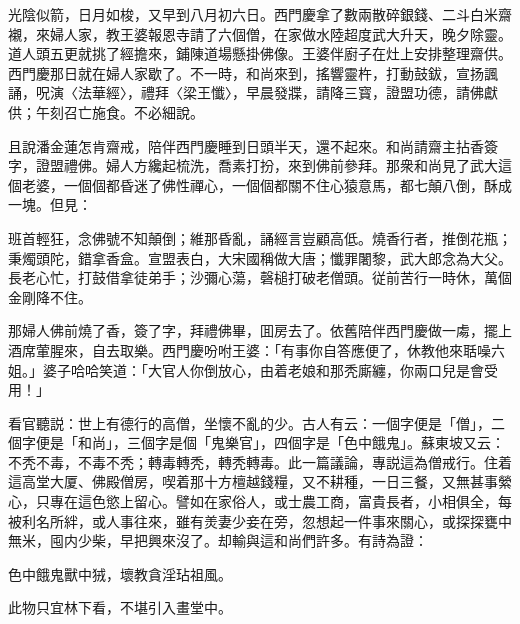 光陰似箭，日月如梭，又早到八月初六日。西門慶拿了數兩散碎銀錢、二斗白米齋襯，來婦人家，教王婆報恩寺請了六個僧，在家做水陸超度武大升天，晚夕除靈。道人頭五更就挑了經擔來，鋪陳道場懸掛佛像。王婆伴廚子在灶上安排整理齋供。西門慶那日就在婦人家歇了。不一時，和尚來到，搖響靈杵，打動鼓鈸，宣扬諷誦，呪演〈法華經〉，禮拜〈梁王懺〉，早晨發牃，請降三寳，證盟功德，請佛獻供；午刻召亡施食。不必細說。

且說潘金蓮怎肯齋戒，陪伴西門慶睡到日頭半天，還不起來。和尚請齋主拈香簽字，證盟禮佛。婦人方纔起梳洗，喬素打扮，來到佛前參拜。那衆和尚見了武大這個老婆，一個個都昏迷了佛性禪心，一個個都關不住心猿意馬，都七顛八倒，酥成一塊。但見：
\begin{myquote}
班首輕狂，念佛號不知顛倒；維那昏亂，誦經言豈顧高低。燒香行者，推倒花瓶；秉燭頭陀，錯拿香盒。宣盟表白，大宋國稱做大唐；懺罪闍黎，武大郎念為大父。長老心忙，打鼓借拿徒弟手；沙彌心蕩，磬槌打破老僧頭。従前苦行一時休，萬個金剛降不住。
\end{myquote}

那婦人佛前燒了香，簽了字，拜禮佛畢，囬房去了。依舊陪伴西門慶做一䖏，擺上酒席葷腥來，自去取樂。西門慶吩咐王婆：「有事你自答應便了，休教他來聒噪六姐。」婆子哈哈笑道：「大官人你倒放心，由着老娘和那秃廝纏，你兩口兒是會受用！」

看官聽説：世上有德行的高僧，坐懷不亂的少。古人有云：一個字便是「僧」，二個字便是「和尚」，三個字是個「鬼樂官」，四個字是「色中餓鬼」。蘇東坡又云：不秃不毒，不毒不秃；轉毒轉秃，轉秃轉毒。此一篇議論，專説這為僧戒行。住着這高堂大厦、佛殿僧房，喫着那十方檀越錢糧，又不耕種，一日三餐，又無甚事縈心，只專在這色慾上留心。譬如在家俗人，或士農工商，富貴長者，小相俱全，每被利名所絆，或人事往來，雖有羙妻少妾在旁，忽想起一件事來關心，或探探甕中無米，囤内少柴，早把興來沒了。却輸與這和尚們許多。有詩為證：
\begin{myquote}
色中餓鬼獸中狨，壞教貪淫玷祖風。

此物只宜林下看，不堪引入畫堂中。
\end{myquote}

